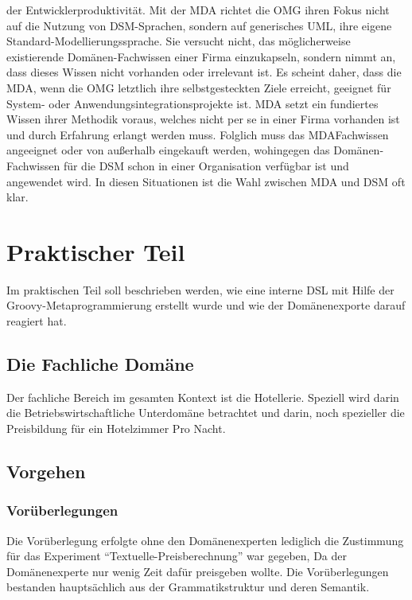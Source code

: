 \documentclass[11pt,english,ngerman, headsepline]{scrreprt}
\begin{document}
der Entwicklerproduktivität.
Mit der MDA richtet die OMG ihren Fokus nicht auf die Nutzung
von DSM-Sprachen, sondern auf generisches UML, ihre
eigene Standard-Modellierungssprache. Sie versucht nicht, das
möglicherweise existierende Domänen-Fachwissen einer Firma
einzukapseln, sondern nimmt an, dass dieses Wissen nicht
vorhanden oder irrelevant ist. Es scheint daher, dass die MDA,
wenn die OMG letztlich ihre selbstgesteckten Ziele erreicht, geeignet
für System- oder Anwendungsintegrationsprojekte ist.
MDA setzt ein fundiertes Wissen ihrer Methodik voraus,
welches nicht per se in einer Firma vorhanden ist und durch
Erfahrung erlangt werden muss. Folglich muss das MDAFachwissen
angeeignet oder von außerhalb eingekauft werden,
wohingegen das Domänen-Fachwissen für die DSM schon in
einer Organisation verfügbar ist und angewendet wird. In diesen
Situationen ist die Wahl zwischen MDA und DSM oft klar.
 \cite{dsmUhrenArtikel}
 
 
 
\chapter{Praktischer Teil}

Im praktischen Teil soll beschrieben werden, wie eine interne DSL mit Hilfe der
Groovy-Metaprogrammierung erstellt wurde und wie der Domänenexporte darauf
reagiert hat.

\section{Die Fachliche Domäne}
Der fachliche Bereich im gesamten Kontext ist die Hotellerie. Speziell wird
darin die Betriebswirtschaftliche Unterdomäne betrachtet und darin, noch
spezieller die Preisbildung für ein Hotelzimmer Pro Nacht.

\section{Vorgehen}

\subsection{Vorüberlegungen}

Die Vorüberlegung erfolgte ohne den Domänenexperten lediglich die Zustimmung
für das Experiment ``Textuelle-Preisberechnung'' war gegeben, Da der
Domänenexperte nur wenig Zeit dafür preisgeben wollte. Die Vorüberlegungen
bestanden hauptsächlich aus der Grammatikstruktur und deren Semantik.
\end{document}
